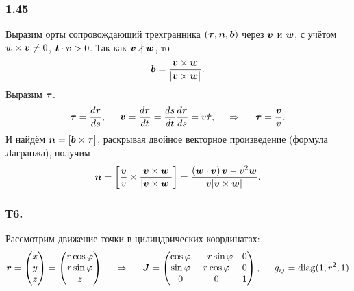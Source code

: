 \subsubsection*{1.45}
Выразим орты сопровождающий трехгранника $(\mbox{\boldmath $\tau$}, \mbox{\boldmath $n$}, \mbox{\boldmath $b$})$ через $\mbox{\boldmath $v$}$ и $\mbox{\boldmath $w$}$, с учётом $w \times \mbox{\boldmath $v$} \neq 0$, $\mbox{\boldmath $t$} \cdot \mbox{\boldmath $v$} > 0$.
Так как $\mbox{\boldmath $v$} \nparallel \mbox{\boldmath $w$}$, то
$$
    \mbox{\boldmath $b$} = \frac{\mbox{\boldmath $v$} \times \mbox{\boldmath $w$}}{|\mbox{\boldmath $v$} \times \mbox{\boldmath $w$}|}.
$$
Выразим $\mbox{\boldmath $\tau$}$.
$$
    \mbox{\boldmath $\tau$} = \frac{d \mbox{\boldmath $r$}}{d s}, \hspace{0.5cm} 
    \mbox{\boldmath $v$} = \frac{d \mbox{\boldmath $r$}}{d t} = \frac{ds}{dt} \frac{d \mbox{\boldmath $r$}}{ds} = v \dot{\tau},
    \hspace{0.5cm} \Rightarrow \hspace{0.5cm} 
    \mbox{\boldmath $\tau$} = \frac{\mbox{\boldmath $v$}}{v}.
$$
И найдём $\mbox{\boldmath $n$} = [\mbox{\boldmath $b$} \times \mbox{\boldmath $\tau$}]$, раскрывая двойное векторное произведение (формула Лагранжа), получим
$$
    \mbox{\boldmath $n$} = \left[\frac{\mbox{\boldmath $v$}}{v} \times \frac{\mbox{\boldmath $v$} \times \mbox{\boldmath $w$}}{|\mbox{\boldmath $v$} \times \mbox{\boldmath $w$}|}\right]=
    \frac{\left(\mbox{\boldmath $w$} \cdot \mbox{\boldmath $v$}\right)\mbox{\boldmath $v$} - v^2 \mbox{\boldmath $w$}}{v |\mbox{\boldmath $v$} \times \mbox{\boldmath $w$}|} .
$$

\subsubsection*{Т6.}

Рассмотрим движение точки в цилиндрических координатах:
$$
    \mbox{\boldmath $r$} = \begin{pmatrix}
        x \\ y \\ z  
    \end{pmatrix} = \begin{pmatrix}
        r \cos \varphi \\ r \sin \varphi \\ z
    \end{pmatrix}
    \hspace{0.5cm} \Rightarrow \hspace{0.5cm} 
    \mbox{\boldmath $J$} = \begin{pmatrix}
        \cos \varphi & - r \sin \varphi & 0 \\
        \sin \varphi & r \cos \varphi & 0 \\
        0 & 0 & 1
    \end{pmatrix}, \hspace{0.5cm} 
    g_{ij} = \mathop{\mathrm{diag}}\nolimits(1, r^2, 1)
$$

